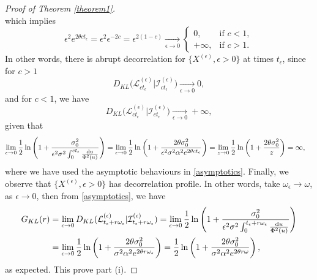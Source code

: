 \documentclass[12pt,thmsa]{article}
\begin{document}
\begin{proof}[Proof of Theorem \ref{theorem1}]
\[	\] 
	which implies
	\[
	\epsilon^2e^{2\theta c t_\epsilon}=\epsilon^2\epsilon^{-2 c}=\epsilon^{2(1-c)}\xrightarrow[\epsilon\to 0]{}\left\{
	\begin{array}{ll}
		0,  & \mathrm{ if } \,\,c<1,\\
		+\infty, & \mathrm{ if }\,\, c>1.
	\end{array}
	\right.
	\]
	In other words,  there is abrupt decorrelation for $\{X^{(\epsilon)}, \epsilon>0\}$  at times $t_\epsilon$, since for $c>1$
	\[
	D_{KL}\Big(\mathcal{L}^{(\epsilon)}_{c t_\epsilon}\Big|\mathcal{I}^{(\epsilon)}_{c t_\epsilon}\Big)\xrightarrow[\epsilon\to 0]{}0,
	\]
	and for  $c<1$, we have 
	\[
	D_{KL}\Big(\mathcal{L}^{(\epsilon)}_{c t_\epsilon}\Big|\mathcal{I}^{(\epsilon)}_{c t_\epsilon}\Big)\xrightarrow[\epsilon\to 0]{}+\infty,
	\]
	given that
	\[
	\begin{split}
		\lim_{\epsilon\to 0}\frac{1}{2}\ln\left(1+\frac{\sigma_0^2}{\epsilon^2\sigma^2\int_0^{ c t_\epsilon}\frac{{\rm d}u}{\Phi^2(u)}}\right)&=\lim_{\epsilon\to 0}\frac{1}{2}\ln\left(1+\frac{2\theta\sigma_0^2}{\epsilon^2\sigma^2 \alpha^2e^{2\theta c t_\epsilon}}\right)=\lim_{z\to 0}\frac{1}{2}\ln\left(1+\frac{2\theta\sigma_0^2}{z}\right)=\infty,
	\end{split}
	\]
	where we have used the asymptotic behaviours  in \eqref{asymptotics}. Finally, we observe that $\{X^{(\epsilon)}, \epsilon>0\}$ has  decorrelation profile. In other words, take $\omega_\epsilon\to \omega$, as $\epsilon\to 0$, then from \eqref{asymptotics}, we have
	\[
	\begin{split}
		G_{KL}(r)&=\lim_{\epsilon\to0}D_{KL}(\mathcal{L}^{(\epsilon)}_{t_\epsilon+r\omega_{\epsilon}}|\mathcal{I}^{(\epsilon)}_{t_\epsilon+r\omega_{\epsilon}})=\lim_{\epsilon\to0}\frac{1}{2}\ln\left(1+\frac{\sigma_0^2}{\epsilon^2\sigma^2\int_0^{ t_\epsilon+r\omega_{\epsilon}}\frac{{\rm d}u}{\Phi^2(u)}}\right)\\
		&= \lim_{\epsilon\to0}\frac{1}{2}\ln\left(1+\frac{2\theta\sigma_0^2}{\sigma^2 \alpha^2e^{2\theta r\omega_\epsilon}}\right)=\frac{1}{2}\ln\left(1+\frac{2\theta\sigma_0^2}{\sigma^2 \alpha^2e^{2\theta r\omega}}\right),
	\end{split}
	\]
	as expected. This prove part (i).
	

\end{proof}
\end{document}
